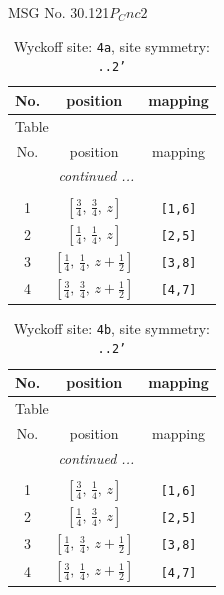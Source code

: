 \documentclass[fleqn,8pt]{jsarticle}
\begin{document}
\setcounter{MaxMatrixCols}{32}

\renewcommand{\tablename}{Table~}
\renewcommand{\figurename}{Figure~}
\begin{center}
\LARGE
MSG No. 30.121\quad$P_{C}nc2$
\end{center}
\renewcommand{\arraystretch}{1.2}
\begin{longtable}{ccc}
\caption{Wyckoff site: {\tt 4a}, site symmetry: {\tt ..2'}}
 \\
 \hline \hline
No. & position & mapping \\ \hline \endfirsthead

\multicolumn{2}{l}{\tablename\ \thetable{}} \\
 \hline \hline
No. & position & mapping \\ \hline \endhead

 \hline \hline
\multicolumn{2}{r}{\footnotesize\it continued ...} \\ \endfoot

 \hline \hline
\multicolumn{2}{r}{} \\ \endlastfoot

1 & $\left[ \frac{3}{4},\, \frac{3}{4},\, z \right]$ & {\tt [1,6]} \\ \hline
2 & $\left[ \frac{1}{4},\, \frac{1}{4},\, z \right]$ & {\tt [2,5]} \\ \hline
3 & $\left[ \frac{1}{4},\, \frac{1}{4},\, z + \frac{1}{2} \right]$ & {\tt [3,8]} \\ \hline
4 & $\left[ \frac{3}{4},\, \frac{3}{4},\, z + \frac{1}{2} \right]$ & {\tt [4,7]} \\
\end{longtable}
\renewcommand{\arraystretch}{1.2}
\begin{longtable}{ccc}
\caption{Wyckoff site: {\tt 4b}, site symmetry: {\tt ..2'}}
 \\
 \hline \hline
No. & position & mapping \\ \hline \endfirsthead

\multicolumn{2}{l}{\tablename\ \thetable{}} \\
 \hline \hline
No. & position & mapping \\ \hline \endhead

 \hline \hline
\multicolumn{2}{r}{\footnotesize\it continued ...} \\ \endfoot

 \hline \hline
\multicolumn{2}{r}{} \\ \endlastfoot

1 & $\left[ \frac{3}{4},\, \frac{1}{4},\, z \right]$ & {\tt [1,6]} \\ \hline
2 & $\left[ \frac{1}{4},\, \frac{3}{4},\, z \right]$ & {\tt [2,5]} \\ \hline
3 & $\left[ \frac{1}{4},\, \frac{3}{4},\, z + \frac{1}{2} \right]$ & {\tt [3,8]} \\ \hline
4 & $\left[ \frac{3}{4},\, \frac{1}{4},\, z + \frac{1}{2} \right]$ & {\tt [4,7]} \\
\end{longtable}
\end{document}
